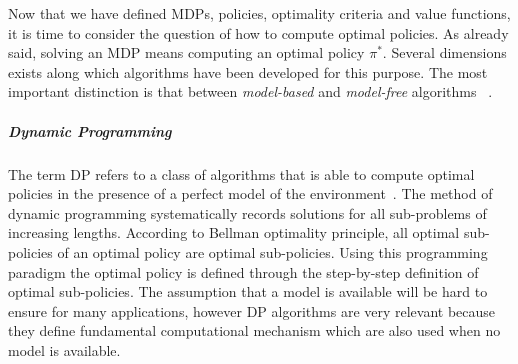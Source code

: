 Now that we have defined MDPs, policies, optimality criteria and value functions, it is time to consider the question of how to compute optimal policies. As already said, solving an MDP means computing an optimal policy $\pi^*$. Several dimensions exists along which algorithms have been developed for this purpose. The most important distinction is that between \textit{model-based} and \textit{model-free} algorithms ~\cite{wiering2012reinforcement}.
\begin{table}[h!]
	\caption{Main differences between model-based and model-free algorithms.}
\end{table}

\subparagraph{Dynamic Programming} The term DP refers to a class of algorithms that is able to compute optimal policies in the presence of a perfect model of the environment~\cite{wiering2012reinforcement}. The method of dynamic programming systematically records solutions for all sub-problems of increasing lengths. According to Bellman optimality principle, all optimal sub-policies of an optimal policy are optimal sub-policies. Using this programming paradigm the optimal policy is defined through the step-by-step definition of optimal sub-policies.
The assumption that a model is available will be hard to ensure for many applications, however DP algorithms are very relevant because they define fundamental computational mechanism which are also used when no model is available.




